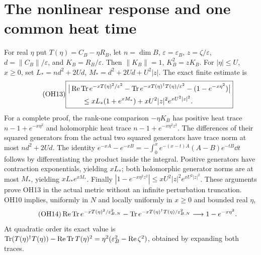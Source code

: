 \documentclass[11pt]{article}
\newcommand{\Tr}{\operatorname{Tr}}\newcommand{\diag}{\operatorname{diag}}
\newcommand{\eps}{\varepsilon}
\begin{document}
\section{The nonlinear response and one common heat time}
For real $\eta$ put $T(\eta)=C_B-\eta R_B$, let $n=\dim B$,
$\eps=\eps_B$, $z=\zeta/\eps$, $d=\|C_B\|/\eps$, and
$K_B=R_B/\eps$. Then $\|K_B\|=1$, $K_B^2=zK_B$.
For $|\eta|\le U$, $x\ge0$, set
$L_*=nd^2+2Ud$, $M_*=d^2+2Ud+U^2|z|$. The exact finite estimate is
\begin{equation}\tag{OH13}\boxed{\begin{aligned}
 &\big|\Rea\Tr e^{-xT(\eta)^2/\eps^2}
 -\Tr e^{-xT(\eta)^\dagger T(\eta)/\eps^2}
 -(1-e^{-x\eta^2})\big|\\
 &\qquad\le xL_*(1+e^{xM_*})+xU^2|z|^2e^{xU^2|z|^2}.
\end{aligned}}\end{equation}
For a complete proof, the rank-one comparison $-\eta K_B$ has
positive heat trace $n-1+e^{-x\eta^2}$ and holomorphic heat trace
$n-1+e^{-x\eta^2z^2}$. The differences of their squared generators
from the actual two squared generators have trace norm at most
$nd^2+2Ud$. The identity
$e^{-xA}-e^{-xB}=-\int_0^x e^{-(x-t)A}(A-B)e^{-tB}\dd t$
follows by differentiating the product inside the integral. Positive
generators have contraction exponentials, yielding $xL_*$; both
holomorphic generator norms are at most $M_*$, yielding $xL_*e^{xM_*}$.
Finally $|1-e^{-x\eta^2z^2}|\le xU^2|z|^2e^{xU^2|z|^2}$.
These arguments prove OH13 in the actual metric without an infinite
perturbation truncation. OH10 implies, uniformly in $N$ and locally
uniformly in $x\ge0$ and bounded real $\eta$,
\begin{equation}\tag{OH14}
 \Rea\Tr e^{-xT(\eta)^2/\eps_{B,N}^2}
 -\Tr e^{-xT(\eta)^\dagger T(\eta)/\eps_{B,N}^2}
 \longrightarrow1-e^{-x\eta^2}.
\end{equation}
At quadratic order its exact value is
$\Tr(T(\eta)^\dagger T(\eta))-\Rea\Tr T(\eta)^2
=\eta^2(\eps_B^2-\Rea\zeta^2)$, obtained by expanding both traces.
\end{document}
